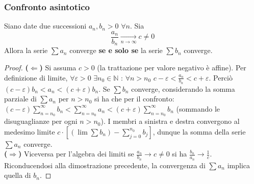 \documentclass[10pt]{article}
\theoremstyle{plain}
\begin{document}
\subsubsection{Confronto asintotico}
\begin{ther}
Siano date due successioni $a_n, b_n > 0$ $\forall n$. Sia
\[\frac{a_n}{b_n} \xrightarrow[n \rightarrow \infty]{} c \neq 0\]
Allora la serie $\sum a_n$ converge \textbf{se e solo se} la serie $\sum b_n$ converge.
\end{ther}
\begin{proof}
\textbf{($\Leftarrow$)} Si assuma $c > 0$ (la trattazione per valore negativo è affine). Per definizione di limite, $\forall \varepsilon > 0$ $\exists n_0 \in \mathbb{N}$ : $\forall n > n_0$ $c - \varepsilon < \frac{a_n}{b_n} < c + \varepsilon$. Perciò $(c - \varepsilon) b_n < a_n < (c + \varepsilon) b_n$. Se $\sum b_n$ converge, considerando la somma parziale di $\sum a_n$ per $n > n_0$ si ha che per il confronto: $(c - \varepsilon) \sum_{n = n_0}^{\infty} b_n < \sum_{n = n_0}^{\infty} a_n < (c + \varepsilon) \sum_{n = n_0}^{\infty} b_n$ (sommando le disuguaglianze per ogni $n > n_0$). I membri a sinistra e destra convergono al medesimo limite $c \cdot [(\lim \sum b_n) - \sum_{j = 0}^{n_0} b_j ]$, dunque la somma della serie $\sum a_n$ converge.
\\\textbf{($\Rightarrow$)} Viceversa per l'algebra dei limiti se $\frac{a_n}{b_n} \rightarrow c \neq 0$ si ha $\frac{b_n}{a_n} \rightarrow \frac{1}{c}$. Riconducendosi alla dimostrazione precedente, la convergenza di $\sum a_n$ implica quella di $b_n$.
\end{proof}
\end{document}
